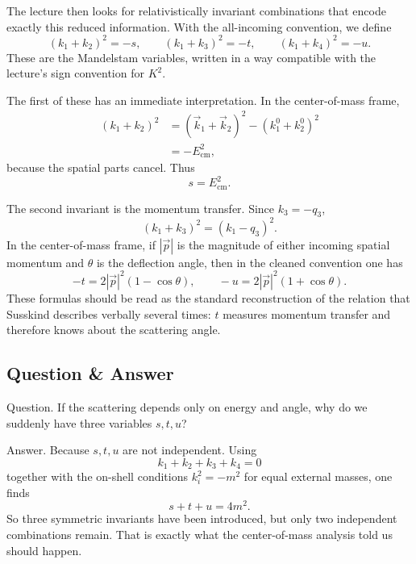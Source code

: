 The lecture then looks for relativistically invariant combinations that encode exactly this reduced information. With the all-incoming convention, we define
\begin{equation}
(k_1+k_2)^2=-s,\qquad (k_1+k_3)^2=-t,\qquad (k_1+k_4)^2=-u.
\end{equation}
These are the Mandelstam variables, written in a way compatible with the lecture's sign convention for \(K^2\).

The first of these has an immediate interpretation. In the center-of-mass frame,
\begin{align}
(k_1+k_2)^2
&= (\vec k_1+\vec k_2)^2-(k_1^0+k_2^0)^2\\
&= -E_{\mathrm{cm}}^2,
\end{align}
because the spatial parts cancel. Thus
\begin{equation}
s=E_{\mathrm{cm}}^2.
\end{equation}

The second invariant is the momentum transfer. Since \(k_3=-q_3\),
\begin{equation}
(k_1+k_3)^2=(k_1-q_3)^2.
\end{equation}
In the center-of-mass frame, if \(|\vec p|\) is the magnitude of either incoming spatial momentum and \(\theta\) is the deflection angle, then in the cleaned convention one has
\begin{equation}
-t = 2|\vec p|^2(1-\cos\theta),\qquad -u = 2|\vec p|^2(1+\cos\theta).
\end{equation}
These formulas should be read as the standard reconstruction of the relation that Susskind describes verbally several times: \(t\) measures momentum transfer and therefore knows about the scattering angle.

\subsection{Question \& Answer}

Question. If the scattering depends only on energy and angle, why do we suddenly have three variables \(s,t,u\)?

Answer. Because \(s,t,u\) are not independent. Using
\begin{equation}
k_1+k_2+k_3+k_4=0
\end{equation}
together with the on-shell conditions \(k_i^2=-m^2\) for equal external masses, one finds
\begin{equation}
s+t+u=4m^2.
\end{equation}
So three symmetric invariants have been introduced, but only two independent combinations remain. That is exactly what the center-of-mass analysis told us should happen.

